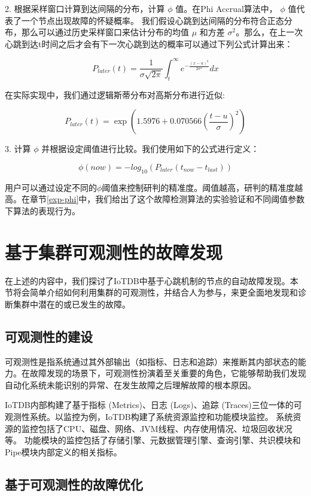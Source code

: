 2. 根据采样窗口计算到达间隔的分布，计算 $\phi$ 值。在Phi Accrual算法中， $\phi$ 值代表了一个节点出现故障的怀疑概率。
我们假设心跳到达间隔的分布符合正态分布，那么可以通过历史采样窗口来估计分布的均值 $\mu$ 和方差 $\sigma^2$。那么，在上一次心跳到达t时间之后才会有下一次心跳到达的概率可以通过下列公式计算出来：


$$ P_{later}(t) = \frac{1}{\sigma\sqrt{2\pi}} \int_{t}^{\infty} e^{-\frac{(x-u)^2}{2\sigma^2}} dx $$

在实际实现中，我们通过逻辑斯蒂分布对高斯分布进行近似\cite{bronvstejn2013handbook}:

$$ P_{later}(t) = \exp(1.5976 + 0.070566 (\frac{t-u}{\sigma})^2) $$


3. 计算 $\phi$ 并根据设定阈值进行比较。我们使用如下的公式进行定义：

$$ \phi(now) = -log_{10}(P_{later}(t_{now} - t_{last})) $$

用户可以通过设定不同的$\phi$阈值来控制研判的精准度。阈值越高，研判的精准度越高。在章节\ref{exp-phi}中，我们给出了这个故障检测算法的实验验证和不同阈值参数下算法的表现行为。


\section{基于集群可观测性的故障发现}

在上述的内容中，我们探讨了IoTDB中基于心跳机制的节点的自动故障发现。本节将会简单介绍如何利用集群的可观测性，并结合人为参与，来更全面地发现和诊断集群中潜在的或已发生的故障。

\subsection{可观测性的建设}

可观测性是指系统通过其外部输出（如指标、日志和追踪）来推断其内部状态的能力。在故障发现的场景下，可观测性扮演着至关重要的角色，它能够帮助我们发现自动化系统未能识别的异常、在发生故障之后理解故障的根本原因。

IoTDB内部构建了基于指标 (Metrics)、日志 (Logs)、追踪 (Traces)三位一体的可观测性系统。以监控为例，IoTDB构建了系统资源监控和功能模块监控。
系统资源的监控包括了CPU、磁盘、网络、JVM线程、内存使用情况、垃圾回收状况等。
功能模块的监控包括了存储引擎、元数据管理引擎、查询引擎、共识模块和Pipe模块内部定义的相关指标。

\subsection{基于可观测性的故障优化}

